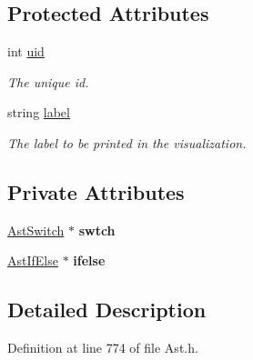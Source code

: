 \subsection*{Protected Attributes}
\begin{DoxyCompactItemize}
\item 
\hypertarget{classAST_a847b778f1c3dd5a19de32de432ee6e15}{int \hyperlink{classAST_a847b778f1c3dd5a19de32de432ee6e15}{uid}}\label{classAST_a847b778f1c3dd5a19de32de432ee6e15}

\begin{DoxyCompactList}\small\item\em The unique id. \end{DoxyCompactList}\item 
\hypertarget{classAST_ab2e239ccc0688d2341724432ff5a1a31}{string \hyperlink{classAST_ab2e239ccc0688d2341724432ff5a1a31}{label}}\label{classAST_ab2e239ccc0688d2341724432ff5a1a31}

\begin{DoxyCompactList}\small\item\em The label to be printed in the visualization. \end{DoxyCompactList}\end{DoxyCompactItemize}
\subsection*{Private Attributes}
\begin{DoxyCompactItemize}
\item 
\hypertarget{classAstSelection_a2f2edb74f35f7aa53b9f26e761217e0a}{\hyperlink{classAstSwitch}{Ast\-Switch} $\ast$ {\bfseries swtch}}\label{classAstSelection_a2f2edb74f35f7aa53b9f26e761217e0a}

\item 
\hypertarget{classAstSelection_a80ba3eb140eb346ea7e4c7fb1342d41e}{\hyperlink{classAstIfElse}{Ast\-If\-Else} $\ast$ {\bfseries ifelse}}\label{classAstSelection_a80ba3eb140eb346ea7e4c7fb1342d41e}

\end{DoxyCompactItemize}


\subsection{Detailed Description}


Definition at line 774 of file Ast.\-h.



